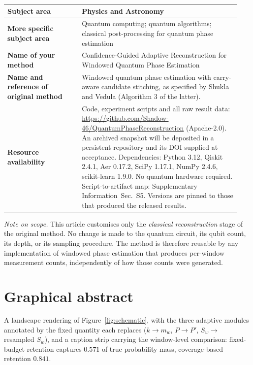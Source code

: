 \documentclass[final,5p,times,longtitle]{elsarticle}
\newcommand{\SI}{Supplementary Information}
\newcommand{\SIartifacts}{\SI{}~Sec.~S5}
\begin{document}
\begin{center}
\small
\begin{tabular}{@{}p{0.30\linewidth}p{0.64\linewidth}@{}}
\toprule
\textbf{Subject area} & Physics and Astronomy \\
\midrule
\textbf{More specific subject area} & Quantum computing; quantum
algorithms; classical post-processing for quantum phase estimation \\
\midrule
\textbf{Name of your method} & Confidence-Guided Adaptive Reconstruction
for Windowed Quantum Phase Estimation \\
\midrule
\textbf{Name and reference of original method} & Windowed quantum phase
estimation with carry-aware candidate stitching, as specified by Shukla
and Vedula \cite{wqpe2025,modularshor2025} (Algorithm 3 of the latter). \\
\midrule
\textbf{Resource availability} & Code, experiment scripts and all raw
result data: \url{https://github.com/Shadow-46/QuantumPhaseReconstruction} (Apache-2.0). An
archived snapshot will be deposited in a persistent repository and its
DOI supplied at acceptance. Dependencies: Python 3.12,
Qiskit \cite{qiskit2024} 2.4.1, Aer 0.17.2, SciPy 1.17.1, NumPy 2.4.6,
scikit-learn 1.9.0. No quantum hardware required.
Script-to-artifact map: \SIartifacts{}. Versions are pinned to those
that produced the released results. \\
\bottomrule
\end{tabular}
\end{center}

\noindent
\textit{Note on scope.} This article customises only the \emph{classical
reconstruction} stage of the original method. No change is made to the
quantum circuit, its qubit count, its depth, or its sampling procedure.
The method is therefore reusable by any implementation of windowed phase
estimation that produces per-window measurement counts, independently of
how those counts were generated.


\section*{Graphical abstract}

\noindent
A landscape rendering of Figure~\ref{fig:schematic}, with the three
adaptive modules annotated by the fixed quantity each replaces
($k\to m_w$, $P\to P'$, $S_w\to$ resampled $S_w$), and a caption strip
carrying the window-level comparison: fixed-budget retention captures
$0.571$ of true probability mass, coverage-based retention $0.841$.
\end{document}
